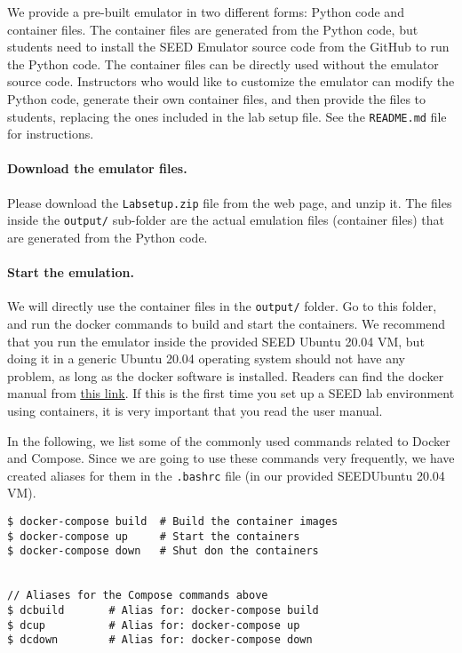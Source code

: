 We provide a pre-built emulator in two different forms: Python code
and container files. The container files are generated from
the Python code, but students need to install the SEED Emulator source
code from the GitHub to run the Python code. The container files
can be directly used without the emulator source code.
Instructors who would like to customize the emulator can modify the Python
code, generate their own container files, and then provide the
files to students, replacing the ones included in the
lab setup file. See the \texttt{README.md} file for instructions. 


\paragraph{Download the emulator files.}
Please download the \texttt{Labsetup.zip} file from the web page, and
unzip it. The files inside the \texttt{output/} sub-folder are the actual
emulation files (container files) that are
generated from the Python code.


\paragraph{Start the emulation.}
We will directly use the container files in the \texttt{output/} folder.
Go to this folder, and run the docker commands
to build and start the containers. We recommend that you run the emulator inside
the provided SEED Ubuntu 20.04 VM, but doing it in a generic Ubuntu 20.04 operating system
should not have any problem, as long as the docker software is installed.
Readers can find the docker manual from
\href{https://github.com/seed-labs/seed-labs/blob/master/manuals/docker/SEEDManual-Container.md}
{\underline{this link}}.
If this is the first time you set up a SEED lab environment
using containers, it is very important that you read 
the user manual. 


In the following, we list some of the commonly
used commands related to Docker and Compose. 
Since we are going to use 
these commands very frequently, we have created aliases for them
in the \texttt{.bashrc} file (in our provided SEEDUbuntu 20.04 VM).

\begin{lstlisting}
$ docker-compose build  # Build the container images
$ docker-compose up     # Start the containers
$ docker-compose down   # Shut don the containers


// Aliases for the Compose commands above
$ dcbuild       # Alias for: docker-compose build
$ dcup          # Alias for: docker-compose up
$ dcdown        # Alias for: docker-compose down
\end{lstlisting}


